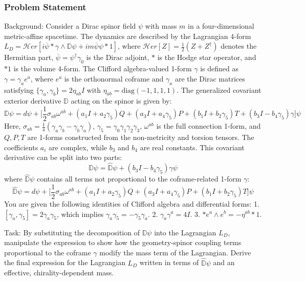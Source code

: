 \documentclass[10pt]{article}
\begin{document}
\subsubsection*{Problem Statement}
Background:
Consider a Dirac spinor field $\psi$ with mass $m$ in a four-dimensional metric-affine spacetime. The dynamics are described by the Lagrangian 4-form
$L_D = \mathcal{H}er \left[ i\overline{\psi} * \gamma \wedge \mathbb{D}\psi + im \overline{\psi} \psi *1 \right]$,
where $\mathcal{H}er[Z] = \frac{1}{2}(Z + Z^\dagger)$ denotes the Hermitian part, $\overline{\psi} = \psi^\dagger \gamma_0$ is the Dirac adjoint, $*$ is the Hodge star operator, and $*1$ is the volume 4-form. The Clifford algebra-valued 1-form $\gamma$ is defined as $\gamma = \gamma_a e^a$, where $e^a$ is the orthonormal coframe and $\gamma_a$ are the Dirac matrices satisfying $\{\gamma_a, \gamma_b\} = 2\eta_{ab}I$ with $\eta_{ab} = \text{diag}(-1,1,1,1)$. The generalized covariant exterior derivative $\mathbb{D}$ acting on the spinor is given by:
$$ \mathbb{D}\psi = d\psi + \Big[\frac{1}{2} \sigma_{ab} \omega^{ab} + (a_1 I  + a_2 \gamma_5) Q + (a_3 I  + a_4 \gamma_5) P + (b_1 I  + b_2 \gamma_5) T + (b_3 I - b_4 \gamma_5) \gamma  \Big] \psi $$
Here, $\sigma_{ab} = \frac{1}{4}(\gamma_a\gamma_b - \gamma_b\gamma_a)$, $\gamma_5 = \gamma_0\gamma_1\gamma_2\gamma_3$, $\omega^{ab}$ is the full connection 1-form, and $Q, P, T$ are 1-forms constructed from the non-metricity and torsion tensors. The coefficients $a_i$ are complex, while $b_3$ and $b_4$ are real constants. This covariant derivative can be split into two parts:
$$ \mathbb{D}\psi = \widehat{\mathbb{D}}\psi + (b_3 I - b_4 \gamma_5)\gamma \psi $$
where $\widehat{\mathbb{D}}\psi$ contains all terms not proportional to the coframe-related 1-form $\gamma$:
$$ \widehat{\mathbb{D}}\psi = d\psi + \Big[\frac{1}{2} \sigma_{ab} \omega^{ab} + (a_1 I  + a_2 \gamma_5) Q + (a_3 I  + a_4 \gamma_5) P + (b_1 I  + b_2 \gamma_5) T \Big] \psi $$
You are given the following identities of Clifford algebra and differential forms:
1. $[\gamma_a, \gamma_5] = 2\gamma_a\gamma_5$, which implies $\gamma_a\gamma_5 = -\gamma_5\gamma_a$.
2. $\gamma_a \gamma^a = 4I$.
3. $*e^a \wedge e^b = -\eta^{ab}*1$.

Task:
By substituting the decomposition of $\mathbb{D}\psi$ into the Lagrangian $L_D$, manipulate the expression to show how the geometry-spinor coupling terms proportional to the coframe $\gamma$ modify the mass term of the Lagrangian. Derive the final expression for the Lagrangian $L_D$ written in terms of $\widehat{\mathbb{D}}\psi$ and an effective, chirality-dependent mass.
\end{document}
